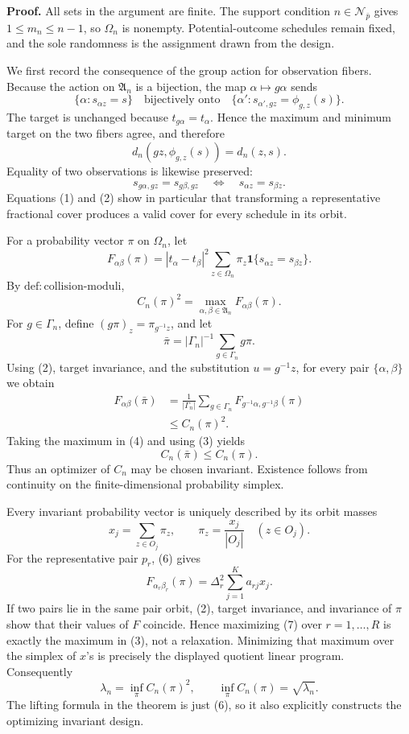 \textbf{Proof.}
All sets in the argument are finite. The support condition \(n\in\mathcal N_{\bar p}\) gives \(1\le m_n\le n-1\), so \(\Omega_n\) is nonempty. Potential-outcome schedules remain fixed, and the sole randomness is the assignment drawn from the design.

We first record the consequence of the group action for observation fibers. Because the action on \(\mathfrak A_n\) is a bijection, the map \(\alpha\mapsto g\alpha\) sends
\[
 \{\alpha:s_{\alpha z}=s\}
 \quad\text{bijectively onto}\quad
 \{\alpha':s_{\alpha',gz}=\phi_{g,z}(s)\}.
\]
The target is unchanged because \(t_{g\alpha}=t_\alpha\). Hence the maximum and minimum target on the two fibers agree, and therefore
\[
 d_n(gz,\phi_{g,z}(s))=d_n(z,s). \tag{1}
\]
Equality of two observations is likewise preserved:
\[
 s_{g\alpha,gz}=s_{g\beta,gz}
 \quad\Longleftrightarrow\quad
 s_{\alpha z}=s_{\beta z}. \tag{2}
\]
Equations (1) and (2) show in particular that transforming a representative fractional cover produces a valid cover for every schedule in its orbit.

For a probability vector \(\pi\) on \(\Omega_n\), let
\[
 F_{\alpha\beta}(\pi)
 =|t_\alpha-t_\beta|^2
   \sum_{z\in\Omega_n}\pi_z
   \mathbf 1\{s_{\alpha z}=s_{\beta z}\}.
\]
By \(\mathrm{def{:}collision\text{-}moduli}\),
\[
 C_n(\pi)^2=\max_{\alpha,\beta\in\mathfrak A_n}F_{\alpha\beta}(\pi). \tag{3}
\]
For \(g\in\Gamma_n\), define \((g\pi)_z=\pi_{g^{-1}z}\), and let
\[
 \bar\pi=|\Gamma_n|^{-1}\sum_{g\in\Gamma_n}g\pi.
\]
Using (2), target invariance, and the substitution \(u=g^{-1}z\), for every pair \(\{\alpha,\beta\}\) we obtain
\[
 \begin{aligned}
 F_{\alpha\beta}(\bar\pi)
 &=\frac1{|\Gamma_n|}\sum_{g\in\Gamma_n}
   F_{g^{-1}\alpha,g^{-1}\beta}(\pi)\\
 &\le C_n(\pi)^2.
 \end{aligned} \tag{4}
\]
Taking the maximum in (4) and using (3) yields
\[
 C_n(\bar\pi)\le C_n(\pi). \tag{5}
\]
Thus an optimizer of \(C_n\) may be chosen invariant. Existence follows from continuity on the finite-dimensional probability simplex.

Every invariant probability vector is uniquely described by its orbit masses
\[
 x_j=\sum_{z\in O_j}\pi_z,
 \qquad
 \pi_z=\frac{x_j}{|O_j|}\quad(z\in O_j). \tag{6}
\]
For the representative pair \(p_r\), (6) gives
\[
 F_{\alpha_r\beta_r}(\pi)
 =\Delta_r^2\sum_{j=1}^K a_{rj}x_j. \tag{7}
\]
If two pairs lie in the same pair orbit, (2), target invariance, and invariance of \(\pi\) show that their values of \(F\) coincide. Hence maximizing (7) over \(r=1,\ldots,R\) is exactly the maximum in (3), not a relaxation. Minimizing that maximum over the simplex of \(x\)'s is precisely the displayed quotient linear program. Consequently
\[
 \lambda_n=\inf_\pi C_n(\pi)^2,
 \qquad
 \inf_\pi C_n(\pi)=\sqrt{\lambda_n}. \tag{8}
\]
The lifting formula in the theorem is just (6), so it also explicitly constructs the optimizing invariant design.

